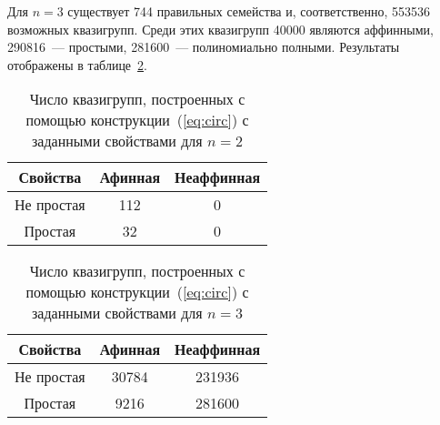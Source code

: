     Для $n=3$ существует 744 правильных семейства и, соответственно, 553536 возможных квазигрупп.
    Среди этих квазигрупп 40000 являются аффинными, 290816~--- простыми, 281600~--- полиномиально полными.
    Результаты отображены в таблице~\ref{tab:polycomp3}.

    \begin{table}[h]
        \begin{center}
            \captionsetup{justification=centering} %
            \caption{\label{tab:polycomp2} Число квазигрупп, построенных с помощью конструкции~(\ref{eq:circ}) с заданными свойствами для $n=2$}
            \begin{tabular}{|c|c|c|}
                \toprule
                Свойства & Афинная & Неаффинная \\
                \midrule
                Не простая & 112 & 0 \\
                \midrule
                Простая & 32 & 0 \\
                \bottomrule
            \end{tabular}
        \end{center}
    \end{table}

    \begin{table}[h]
        \begin{center}
            \captionsetup{justification=centering} %
            \caption{\label{tab:polycomp3} Число квазигрупп, построенных с помощью конструкции~(\ref{eq:circ}) с заданными свойствами для $n=3$}
            \begin{tabular}{|c|c|c|}
                \toprule
                Свойства & Афинная & Неаффинная \\
                \midrule
                Не простая & 30784 & 231936 \\
                \midrule
                Простая & 9216 & 281600 \\
                \bottomrule
            \end{tabular}
        \end{center}
    \end{table}





